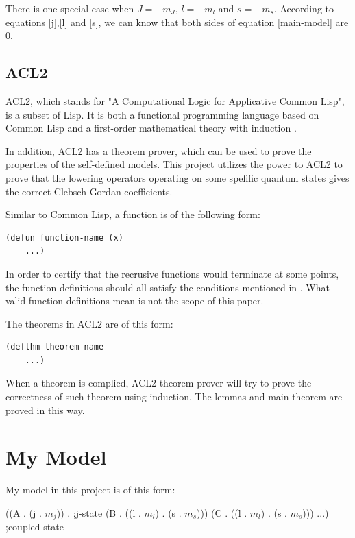 \documentclass[12pt,journal,compsoc]{IEEEtran}
\begin{document}
There is one special case when $J=-m_J$, $l=-m_l$ and $s=-m_s$. According to equations \ref{j},\ref{l} and \ref{s}, we can know that both sides of equation \ref{main-model} are 0. 

\subsection{ACL2}

ACL2, which stands for "A Computational Logic for Applicative Common Lisp", is a subset of Lisp. It is both a functional programming language based on Common Lisp and a first-order mathematical theory with induction \cite{acl2}.

In addition, ACL2 has a theorem prover, which can be used to prove the properties of the self-defined models. This project utilizes the power to ACL2 to prove that the lowering operators operating on some spefific quantum states gives the correct Clebsch-Gordan coefficients.

Similar to Common Lisp, a function is of the following form:

\begin{verbatim}
(defun function-name (x)
	...)
\end{verbatim}

In order to certify that the recrusive functions would terminate at some points, the function definitions should all satisfy the conditions mentioned in \cite{acl2}. What valid function definitions mean is not the scope of this paper. 

The theorems in ACL2 are of this form:

\begin{verbatim}
(defthm theorem-name
	...)
\end{verbatim}

When a theorem is complied, ACL2 theorem prover will try to prove the correctness of such theorem using induction. The lemmas and main theorem are proved in this way.

\section{My Model}

My model in this project is of this form:

\begin{acl2-lst}[mathescape]
((A . (j . $m_j$)) .   ;j-state
(B . ((l . $m_l$) . (s . $m_s$)))
(C . ((l . $m_l$) . (s . $m_s$)))
...) ;coupled-state
\end{acl2-lst}
\end{document}
